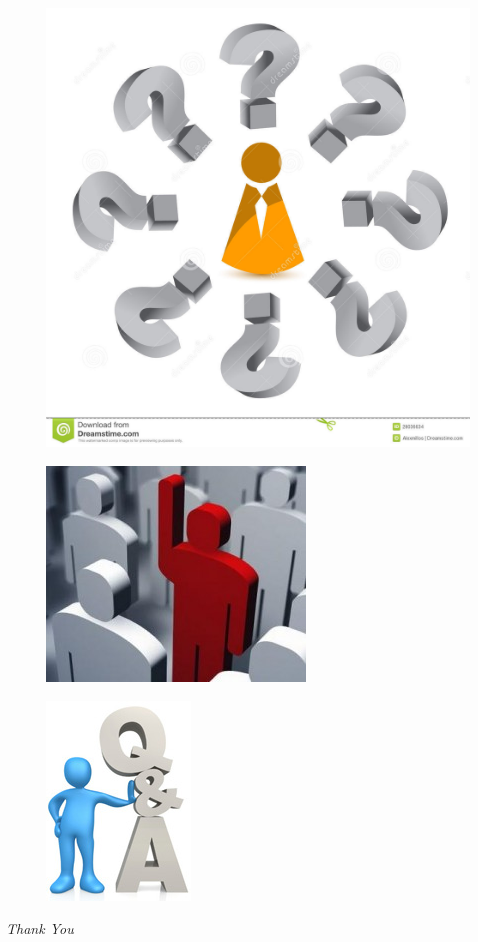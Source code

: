 \documentclass{beamer}
\begin{document}
\begin{frame}
	\begin{figure}
	\includegraphics{QandA/QandA8}
	\end{figure}
\end{frame}

\begin{frame}
	\begin{figure}
	\includegraphics{QandA/QandA9}
	\end{figure}
\end{frame}

\begin{frame}
	\begin{figure}
	\includegraphics{QandA/QandA10}
	\end{figure}
\end{frame}

	

\begin{frame}
 	\begin{center}
 	\fontsize{72}{72}\selectfont
  \emph{Thank You}
  \end{center}
\end{frame}
\end{document}
